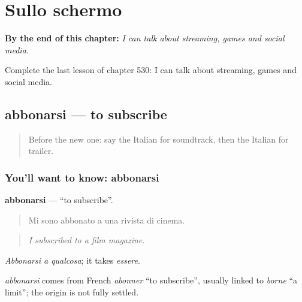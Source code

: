 
\chapter{Sullo schermo}
\label{ch:it-sullo-schermo}

\begin{chapteropening}
\textbf{By the end of this chapter:} \emph{I can talk about streaming, games and social media.}

Complete the last lesson of chapter 530: I can talk about streaming, games and social media.
\end{chapteropening}

\section[abbonarsi]{abbonarsi — to subscribe}

\label{lesson:IT-C530-abbonarsi}



\begin{quote}
Before the new one: say the Italian for soundtrack, then the Italian for trailer.
\end{quote}

\subsection*{You'll want to know: abbonarsi}
\textbf{abbonarsi} — \textquotedblleft{}to subscribe\textquotedblright{}.

\begin{quote}
Mi sono abbonato a una rivista di cinema.
\end{quote}

\begin{quote}
\emph{I subscribed to a film magazine.}
\end{quote}

\emph{Abbonarsi a qualcosa}; it takes \emph{essere}.

\begin{cousinweb}
\emph{abbonarsi} comes from French \emph{abonner} \textquotedblleft{}to subscribe\textquotedblright{}, usually linked to \emph{borne} \textquotedblleft{}a limit\textquotedblright{}; the origin is not fully settled.
\end{cousinweb}

